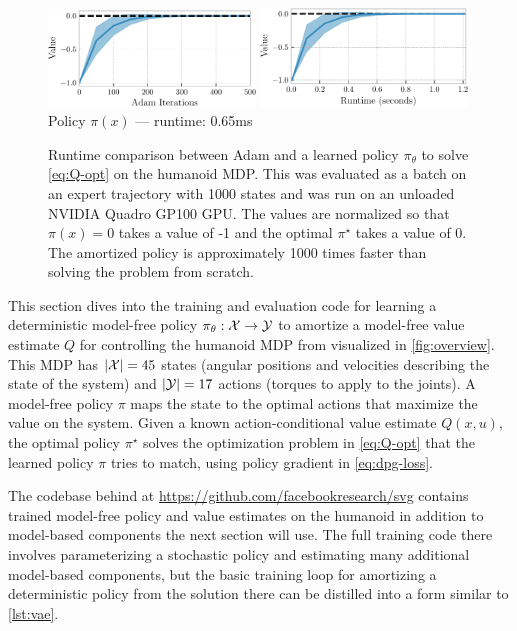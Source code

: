 \begin{figure}[t]
  \centering
  \includegraphics[width=0.49\textwidth]{fig/control-model-free-iter.pdf}
  \hfill
  \includegraphics[width=0.49\textwidth]{fig/control-model-free-time.pdf} \\[5mm]
   Policy $\pi(x)$ --- runtime: 0.65ms
  \caption{
    Runtime comparison between Adam and a learned policy $\pi_\theta$
    to solve \cref{eq:Q-opt} on the humanoid MDP.
    This was evaluated as a batch on an expert trajectory with
    1000 states and was run on an unloaded NVIDIA Quadro GP100 GPU.
    The values are normalized so that $\pi(x)=0$ takes a value of -1 and
    the optimal $\pi^\star$ takes a value of 0.
    The amortized policy is approximately
    1000 times faster than solving the
    problem from scratch.
  }
  \label{fig:model-free-performance}
\end{figure}


This section dives into the training and evaluation code for learning a
deterministic model-free policy $\pi_\theta: {\mathcal{X}}\rightarrow{\mathcal{Y}}$ to amortize a model-free
value estimate $Q$ for controlling the humanoid MDP from
\citet{brockman2016openai}
visualized in \cref{fig:overview}.
This MDP has $|{\mathcal{X}}|=45$ states (angular positions and velocities
describing the state of the system)
and $|{\mathcal{Y}}|=17$ actions (torques to apply to the joints).
A model-free policy $\pi$ maps the state to the optimal actions
that maximize the value on the system.
Given a known action-conditional value estimate $Q(x,u)$,
the optimal policy $\pi^\star$ solves the optimization problem in
\cref{eq:Q-opt} that the learned policy $\pi$ tries to match,
\eg using policy gradient in \cref{eq:dpg-loss}.

The codebase behind \citet{amos2021model} at
\url{https://github.com/facebookresearch/svg}
contains trained model-free policy and value estimates
on the humanoid in addition to model-based components
the next section will use.
The full training code there involves parameterizing
a stochastic policy and estimating many additional
model-based components, but the basic training loop
for amortizing a deterministic policy from the solution
there can be distilled into a form similar to
\cref{lst:vae}.


